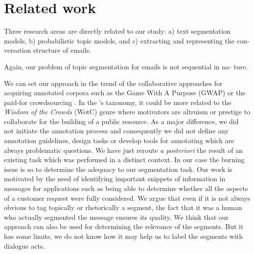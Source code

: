 \section{Related work}
\label{sec:relatedWork}

Three research areas are directly related to our study:
a) text segmentation models, b) probabilistic topic
models, and c) extracting and representing the con-
versation structure of emails.

Again, our problem of
topic segmentation for emails is not sequential in na-
ture.

We can set our approach in the trend of the collaborative approaches for acquiring
annotated corpora such as the Game With A Purpose (GWAP) \cite{ahn:2006:computer} or the paid-for crowdsourcing \cite{fort:2011:cl}.
In the \cite{wang:2013:lre}'s taxonomy, it could be more related to the \textit{Wisdom of the Crowds} (WotC) genre where motivators are altruism or prestige to collaborate for the building of a public resource.
As a major difference, we did not initiate the annotation process and consequently we did not define any annotation guidelines, design tasks or develop tools for annotating which are always problematic questions.
We have just reroute \textit{a posteriori} the result of an existing task which was performed in a distinct context.
In our case the burning issue is so to determine the adequacy to our segmentation task.
Our work is motivated by the need of identifying important snippets of information in messages for applications such as being able to determine whether all the aspects of a customer request were fully considered.
We argue that even if it is not always obvious to tag topically or rhetorically a segment, the fact that it was a human who actually segmented the message ensures its quality.
%
%
We think that our approach can also be used for determining the relevance of the segments. But it has some limits, we do not know how it may help us to label the segments with dialogue acts.

